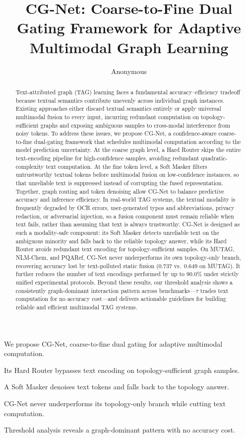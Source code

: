 \documentclass[preprint,12pt,authoryear]{elsarticle}
\title{CG-Net: Coarse-to-Fine Dual Gating Framework for Adaptive Multimodal Graph Learning}
\author{Anonymous}
\begin{document}
\begin{frontmatter}

\begin{abstract}
Text-attributed graph (TAG) learning faces a fundamental accuracy--efficiency tradeoff because textual semantics contribute unevenly across individual graph instances. Existing approaches either discard textual semantics entirely or apply universal multimodal fusion to every input, incurring redundant computation on topology-sufficient graphs and exposing ambiguous samples to cross-modal interference from noisy tokens. To address these issues, we propose CG-Net, a confidence-aware coarse-to-fine dual-gating framework that schedules multimodal computation according to the model prediction uncertainty. At the coarse graph level, a Hard Router skips the entire text-encoding pipeline for high-confidence samples, avoiding redundant quadratic-complexity text computation. At the fine token level, a Soft Masker filters untrustworthy textual tokens before multimodal fusion on low-confidence instances, so that unreliable text is suppressed instead of corrupting the fused representation. Together, graph routing and token denoising allow CG-Net to balance predictive accuracy and inference efficiency. In real-world TAG systems, the textual modality is frequently degraded by OCR errors, user-generated typos and abbreviations, privacy redaction, or adversarial injection, so a fusion component must remain reliable when text fails, rather than assuming that text is always trustworthy. CG-Net is designed as such a modality-safe component: its Soft Masker detects unreliable text on the ambiguous minority and falls back to the reliable topology answer, while its Hard Router avoids redundant text encoding for topology-sufficient samples. On MUTAG, NLM-Chem, and PQARef, CG-Net never underperforms its own topology-only branch, recovering accuracy lost by text-polluted static fusion (0.737 vs.\ 0.649 on MUTAG). It further reduces the number of text encodings performed by up to 90.0\% under strictly unified experimental protocols. Beyond these results, our threshold analysis shows a consistently graph-dominant interaction pattern across benchmarks---$\tau$ trades text computation for no accuracy cost---and delivers actionable guidelines for building reliable and efficient multimodal TAG systems.
\end{abstract}

\begin{highlights}
\item We propose CG-Net, coarse-to-fine dual gating for adaptive multimodal computation.
\item Its Hard Router bypasses text encoding on topology-sufficient graph samples.
\item A Soft Masker denoises text tokens and falls back to the topology answer.
\item CG-Net never underperforms its topology-only branch while cutting text computation.
\item Threshold analysis reveals a graph-dominant pattern with no accuracy cost.
\end{highlights}


\end{frontmatter}
\end{document}
